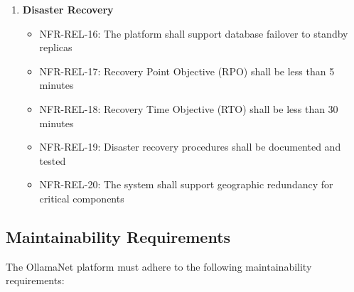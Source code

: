 \begin{enumerate}
   \item \textbf{Disaster Recovery}
   \begin{itemize}
      \item NFR-REL-16: The platform shall support database failover to standby replicas
      \item NFR-REL-17: Recovery Point Objective (RPO) shall be less than 5 minutes
      \item NFR-REL-18: Recovery Time Objective (RTO) shall be less than 30 minutes
      \item NFR-REL-19: Disaster recovery procedures shall be documented and tested
      \item NFR-REL-20: The system shall support geographic redundancy for critical components
   \end{itemize}
\end{enumerate}

\subsection{Maintainability Requirements}

The OllamaNet platform must adhere to the following maintainability requirements:

